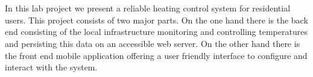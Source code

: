 
\chapter*{\abstractname}
\label{chap:abstract}

In this lab project we present a reliable heating control system for residential users.
This project consists of two major parts.
On the one hand there is the back end consisting of the local infrastructure monitoring and controlling temperatures and persisting this data on an accessible web server.
On the other hand there is the front end mobile application offering a user friendly interface to configure and interact with the system.



